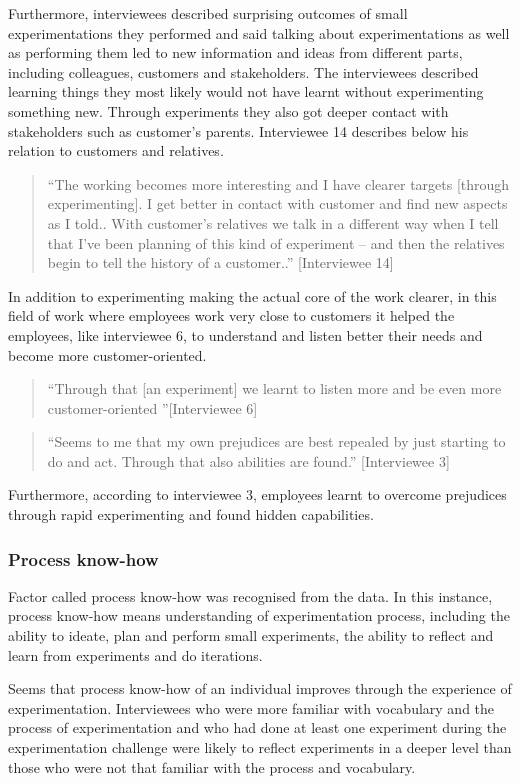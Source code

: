 Furthermore, interviewees described surprising outcomes of small experimentations they performed and said talking about experimentations as well as performing them led to new information and ideas from different parts, including colleagues, customers and stakeholders. The interviewees described learning things they most likely would not have learnt without experimenting something new. Through experiments they also got deeper contact with stakeholders such as customer's parents. Interviewee 14 describes below his relation to customers and relatives.
\begin{quote}
``The working becomes more interesting and I have clearer targets [through experimenting]. I get better in contact with customer and find new aspects as I told.. With customer's relatives we talk in a different way when I tell that I've been planning of this kind of experiment -- and then the relatives begin to tell the history of a customer..'' [Interviewee 14]
\end{quote}
In addition to experimenting making the actual core of the work clearer, in this field of work where employees work very close to customers it helped the employees, like interviewee 6, to understand and listen better their needs and become more customer-oriented.  
\begin{quote}
``Through that [an experiment] we learnt to listen more and be even more customer-oriented ''[Interviewee 6]
\end{quote}
\begin{quote}
``Seems to me that my own prejudices are best repealed by just starting to do and act. Through that also abilities are found.'' [Interviewee 3]
\end{quote}
Furthermore, according to interviewee 3, employees learnt to overcome prejudices through rapid experimenting and found hidden capabilities.

\subsubsection{Process know-how}
Factor called process know-how was recognised from the data. In this instance, process know-how means understanding of experimentation process, including the ability to ideate, plan and perform small experiments, the ability to reflect and learn from experiments and do iterations. 

Seems that process know-how of an individual improves through the experience of experimentation. Interviewees who were more familiar with vocabulary and the process of experimentation and who had done at least one experiment during the experimentation challenge were likely to reflect experiments in a deeper level than those who were not that familiar with the process and vocabulary. 

